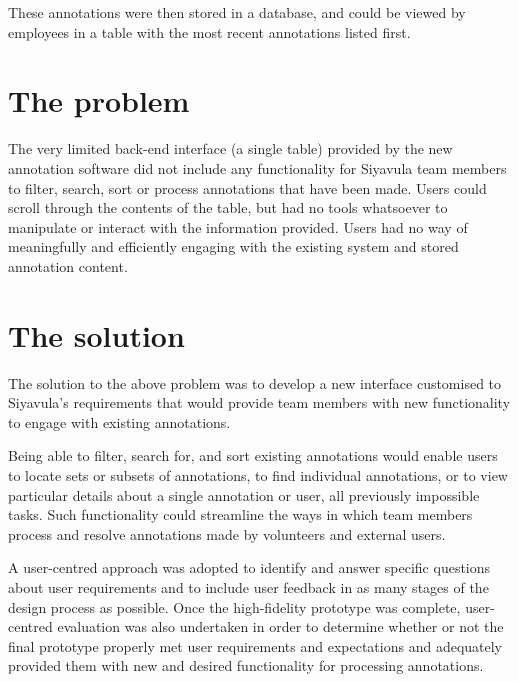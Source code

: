 These annotations were then stored in a database, and could be viewed by employees in a table  with the most recent annotations listed first. 

\section{The problem}
The very limited back-end interface (a single table) provided by the new annotation software did not include any functionality for Siyavula team members to filter, search, sort or process annotations that have been made. Users could scroll through the contents of the table, but had no tools whatsoever to manipulate or interact with the information provided. Users had no way of meaningfully and efficiently engaging with the existing system and stored annotation content.




\section{The solution}
The solution to the above problem was to develop a new interface customised to Siyavula's requirements that would provide team members with new functionality to engage with existing annotations. 

Being able to filter, search for, and sort existing annotations would enable users to locate sets or subsets of annotations, to find individual annotations, or to view particular details about a single annotation or user, all previously impossible tasks. Such functionality could streamline the ways in which team members process and resolve annotations made by volunteers and external users.

A user-centred approach was adopted to identify and answer specific questions about user requirements and to include user feedback in as many stages of the design process as possible. Once the high-fidelity prototype was complete, user-centred evaluation was also undertaken in order to determine whether or not the final prototype properly met user requirements and expectations and adequately provided them with new and desired functionality for processing annotations. 

